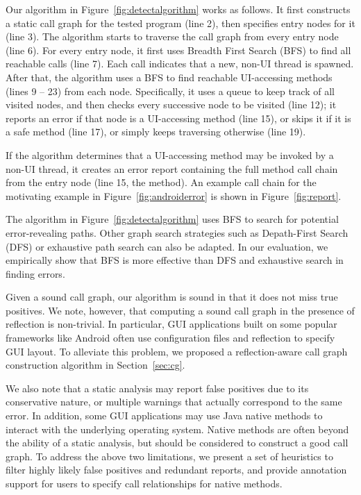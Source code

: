 Our algorithm in Figure~\ref{fig:detectalgorithm} works as follows. It
first constructs a static call graph for the tested program (line 2),
then specifies entry nodes for it (line 3). The algorithm starts to traverse
the call graph from every entry node (line 6). For every entry node,
it first uses Breadth First Search (BFS) to find all reachable
 calls (line 7). Each  call
indicates that a new, non-UI thread is spawned.  After that, 
the algorithm uses a BFS to find reachable UI-accessing methods (lines 9 -- 23)
from each  node.
Specifically, it uses a queue to keep track of all visited nodes, and
then checks every successive node to be visited (line 12);
it reports an error if that node
is a UI-accessing method (line 15), or skips it if it is
a safe method (line 17), or simply keeps traversing otherwise (line 19).

If the algorithm determines that a UI-accessing method may be invoked
by a non-UI thread, it creates an error report containing the full
method call chain from the entry node (line 15, the 
method). An example call chain for
the motivating example in Figure~\ref{fig:androiderror} is shown
in Figure~\ref{fig:report}.

The algorithm in Figure~\ref{fig:detectalgorithm} uses BFS to search
for potential error-revealing paths. Other graph search strategies
such as Depath-First Search (DFS) or exhaustive path search can also be
adapted. In our evaluation, we empirically show that BFS
is more effective than DFS and exhaustive search in finding errors.

Given a sound call graph, our algorithm is sound in that it does not
miss true positives. We note, however, that computing a sound
call graph 
in the presence of reflection is non-trivial. 
In particular, GUI applications built on some popular frameworks like Android
often use configuration files and reflection to specify GUI layout.
To alleviate this problem, we proposed a reflection-aware call graph
construction algorithm in Section~\ref{sec:cg}.

We also note that a static analysis may report false positives due
to its conservative nature, or multiple warnings that actually correspond to
the same error. In addition, some GUI applications may use
Java native methods to interact with the underlying operating system.
Native methods are often beyond the ability of a static analysis, but
should be considered to construct a good call graph. To address the
above two limitations, we present a set of heuristics to filter
highly likely false positives and redundant reports, and provide
annotation support for users to specify call relationships for
 native methods.


